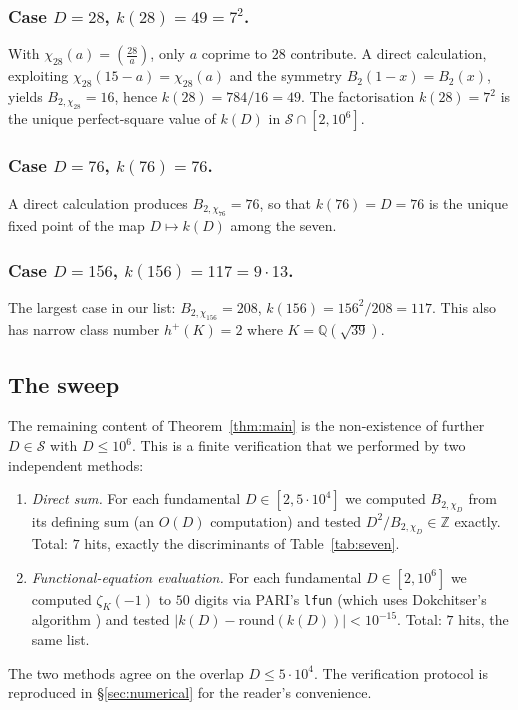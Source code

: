 \documentclass[11pt,reqno]{amsart}
\theoremstyle{plain}
\theoremstyle{definition}
\newcommand{\Q}{\mathbb{Q}}
\newcommand{\Z}{\mathbb{Z}}
\begin{document}
\subsubsection*{Case $D=28$, $k(28)=49=7^{2}$.}
With $\chi_{28}(a)=\left(\frac{28}{a}\right)$, only $a$ coprime to $28$
contribute.  A direct calculation, exploiting $\chi_{28}(15-a)=\chi_{28}(a)$ and
the symmetry $B_{2}(1-x)=B_{2}(x)$, yields
$B_{2,\chi_{28}}=16$, hence $k(28)=784/16=49$.  The factorisation
$k(28)=7^{2}$ is the unique perfect-square value of $k(D)$ in
$\mathcal{S}\cap[2,10^{6}]$.

\subsubsection*{Case $D=76$, $k(76)=76$.}
A direct calculation produces $B_{2,\chi_{76}}=76$, so that $k(76)=D=76$
is the unique fixed point of the map $D\mapsto k(D)$ among the seven.

\subsubsection*{Case $D=156$, $k(156)=117=9\cdot 13$.}
The largest case in our list: $B_{2,\chi_{156}}=208$, $k(156)=156^{2}/208=117$.
This also has narrow class number $h^{+}(K)=2$ where $K=\Q(\sqrt{39})$.

\subsection{The sweep}
The remaining content of Theorem~\ref{thm:main} is the
non-existence of further $D\in\mathcal{S}$ with $D\le 10^{6}$.  This is a
finite verification that we performed by two independent methods:
\begin{enumerate}
\item[\textbf{(M1)}] \emph{Direct sum.}  For each fundamental
$D\in[2,5\cdot 10^{4}]$ we computed $B_{2,\chi_{D}}$ from its defining
sum (an $O(D)$ computation) and tested $D^{2}/B_{2,\chi_{D}}\in\Z$
exactly.  Total: $7$ hits, exactly the discriminants of
Table~\ref{tab:seven}.
\item[\textbf{(M2)}] \emph{Functional-equation evaluation.}  For each
fundamental $D\in[2,10^{6}]$ we computed $\zeta_{K}(-1)$ to $50$ digits
via PARI's \texttt{lfun} (which uses Dokchitser's algorithm
\cite{Dokchitser2004}) and tested
$|k(D)-\mathrm{round}(k(D))|<10^{-15}$.  Total: $7$ hits, the same list.
\end{enumerate}
The two methods agree on the overlap $D\le 5\cdot 10^{4}$.  The
verification protocol is reproduced in \S\ref{sec:numerical} for the
reader's convenience.
\end{document}
